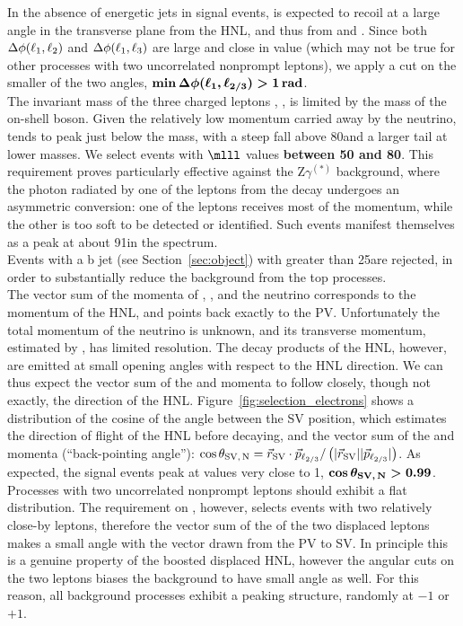 In the absence of energetic jets in signal events, \lone is expected
to recoil at a large angle in the transverse plane from the HNL, and
thus from \ltwo and \lthree. Since both $\Delta\phi(\ell_1,\ell_2)$ and
$\Delta\phi(\ell_1,\ell_3)$ are large and close in value (which may not be
true for other processes with two uncorrelated nonprompt leptons), we
apply a cut on the smaller of the two angles,
$\boldsymbol{\min{\Delta\phi(\ensuremath{\ell_1},\ensuremath{\ell_{2/3}})}>1\,\mathrm{rad}}$. \\

The invariant mass of the three charged leptons \mlll, \mthreel, is limited
by the mass of the on-shell \PW boson. Given the relatively low
momentum carried away by the neutrino, \mlll tends to peak just
below the \PW mass, with a steep fall above 80\GeV and a larger tail
at lower masses. We select
events with $\boldsymbol{\mlll}$ values \textbf{between 50 and 80\GeV}. This requirement
proves particularly effective against the Z$\gamma^{(\ast)}$ background, where the
photon radiated by one of the leptons from the \PZ decay undergoes an
asymmetric conversion: one of the leptons receives most of the \PGg
momentum, while the other is too soft to be detected or
identified. Such events manifest themselves as a peak at about 91\GeV in the \mthreel
spectrum. \\

Events with a b jet (see Section~\ref{sec:object}) with \pt greater
than 25\GeV are rejected, in order to substantially reduce the
background from the top processes.\\

The vector sum of the momenta of \ltwo, \lthree, and the neutrino
corresponds to the momentum of the HNL, and points back exactly to the
PV. Unfortunately the total momentum of the neutrino is unknown, and
its transverse momentum, estimated by \ptmiss, has limited resolution.
The decay products of the HNL, however, are emitted at small opening
angles with respect to the HNL direction. We can thus expect the
vector sum of the \ltwo and \lthree momenta to follow closely, though
not exactly, the direction of the
HNL. Figure~\ref{fig:selection_electrons} shows a distribution of the cosine of the angle between the SV
position, which estimates the direction of flight of the HNL before
decaying, and the vector sum of the \ltwo and \lthree momenta
(``back-pointing angle''):
$\cos{\theta_{\mathrm{SV,\,\ensuremath{\mathrm{N}}}}} = \vec{r}_{\mathrm{SV}}\cdot\vec{p}_{\mathrm{\ell_{2/3}}}/
\left(|\vec{r}_{\mathrm{SV}}||\vec{p}_{\mathrm{\ell_{2/3}}}|\right)$.
As expected, the signal events peak at values very close to 1,
$\boldsymbol{\cos{\theta_{\mathrm{SV,\,\ensuremath{\mathrm{N}}}}} > 0.99}$.
Processes with two uncorrelated nonprompt leptons should exhibit a
flat \costheta distribution. The requirement on \DRtwol, however,
selects events with two relatively close-by leptons, therefore the
vector sum of the \pt of the two displaced leptons makes a small angle
with the vector drawn from the PV to SV. In principle this is a
genuine property of the boosted displaced HNL, however the angular
cuts on the two leptons biases the background to have small angle as
well. For this reason, all
background processes exhibit a peaking structure, randomly at $-1$ or
$+1$.\\

